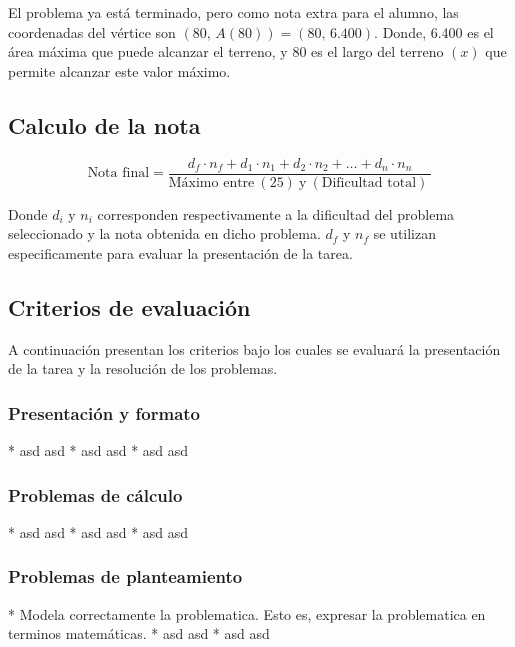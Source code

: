 \documentclass[]{srs2}
\begin{document}
El problema ya está terminado, pero como nota extra para el alumno,
las coordenadas del vértice son
\(\left(80,\,A\left(80\right)\right) = (80,\, 6.400)\). Donde, 6.400
es el área máxima que puede alcanzar el terreno, y 80 es el largo
del terreno \(\left(x\right)\) que permite alcanzar este valor máximo.

\subsection*{Calculo de la nota}

\begin{equation*}
  \text{Nota final} = \dfrac{d_{f}\cdot n_{f} + d_1 \cdot n_1+d_2 \cdot n_2+\dots+d_n \cdot n_n}{\text{Máximo entre}~\left(25\right)~\text{y}~\left(\text{Dificultad total}\right)~}
\end{equation*}

Donde $d_i$ y $n_i$ corresponden respectivamente a la dificultad del problema
seleccionado y la nota obtenida en dicho problema. $d_f$ y $n_f$ se utilizan
especificamente para evaluar la presentación de la tarea.

\subsection*{Criterios de evaluación}

A continuación presentan los criterios bajo los cuales se evaluará la
presentación de la tarea y la resolución de los problemas.

\subsubsection*{Presentación y formato}
\begin{lista}
* asd asd
* asd asd
* asd asd
\end{lista}
\subsubsection*{Problemas de cálculo}
\begin{lista}
* asd asd
* asd asd
* asd asd
\end{lista}
\subsubsection*{Problemas de planteamiento}
\begin{lista}
* Modela correctamente la problematica. Esto es, expresar la problematica
en terminos matemáticas.
* asd asd
* asd asd
\end{lista}
\end{document}
